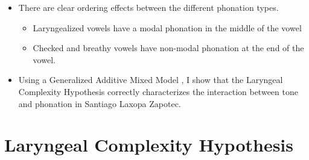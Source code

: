 \documentclass[12pt, letterpaper]{article}
\begin{document}
\begin{itemize}
	\begin{itemize}
		\item There are clear ordering effects between the different phonation types.
		\begin{itemize}
			\item Laryngealized vowels have a modal phonation in the middle of the vowel
			\item Checked and breathy vowels have non-modal phonation at the end of the vowel. 
		\end{itemize} 
		\item Using a Generalized Additive Mixed Model \citep{hastieGeneralizedAdditiveModels1986,woodGeneralizedAdditiveModels2017}, I show that the Laryngeal Complexity Hypothesis correctly characterizes the interaction between tone and phonation in Santiago Laxopa Zapotec. 
	\end{itemize}
\end{itemize}

\section{Laryngeal Complexity Hypothesis} \label{sec:Silverman}
\end{document}
